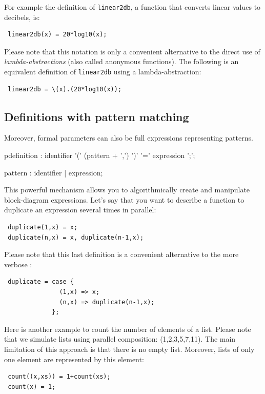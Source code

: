 For example the definition of \lstinline'linear2db', a function that converts linear values to decibels, is:

\begin{lstlisting}
 linear2db(x) = 20*log10(x);
\end{lstlisting}
 
Please note that this notation is only a convenient alternative to the direct use of \textit{lambda-abstractions} (also called anonymous functions). The following is an equivalent definition of \lstinline'linear2db' using a lambda-abstraction:

\begin{lstlisting}
 linear2db = \(x).(20*log10(x));
\end{lstlisting}

\subsection{Definitions with pattern matching}

Moreover, formal parameters can also be full expressions representing patterns. 
\begin{rail}
pdefinition  : identifier '(' (pattern + ',')  ')' '=' expression ';';
\end{rail}

\begin{rail}
pattern : identifier | expression; 
\end{rail}

This powerful mechanism allows you to algorithmically create and manipulate block-diagram expressions. Let's say that you want to describe a function to duplicate an expression several times in parallel:
\begin{lstlisting}
 duplicate(1,x) = x;
 duplicate(n,x) = x, duplicate(n-1,x);
\end{lstlisting}

Please note that this last definition is a convenient alternative to the more verbose :
\begin{lstlisting}
 duplicate = case { 
               (1,x) => x; 
               (n,x) => duplicate(n-1,x); 
             };
\end{lstlisting}

Here is another example to count the number of elements of a list. Please note that we simulate lists using parallel composition: (1,2,3,5,7,11). The main limitation of this approach is that there is no empty list. Moreover, lists of only one element are represented by this element:
\begin{lstlisting}
 count((x,xs)) = 1+count(xs);
 count(x) = 1;
\end{lstlisting}

